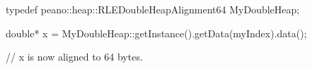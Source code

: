 \begin{code}
typedef peano::heap::RLEDoubleHeapAlignment64  MyDoubleHeap;

double* x = MyDoubleHeap::getInstance().getData(myIndex).data();

// x is now aligned to 64 bytes.
\end{code}


%
%



% 
% 

